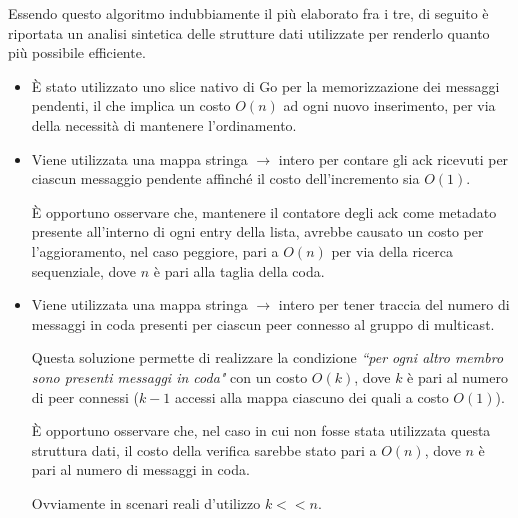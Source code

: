 \documentclass[conference]{IEEEtran}
\begin{document}
Essendo questo algoritmo indubbiamente il più elaborato fra i tre, di seguito è riportata un analisi sintetica delle strutture dati utilizzate per renderlo quanto più possibile efficiente.
\begin{itemize}
\item È stato utilizzato uno slice nativo di Go per la memorizzazione dei messaggi pendenti, il che implica un costo $O(n)$ ad ogni nuovo inserimento, per via della necessità di mantenere l'ordinamento.

\item Viene utilizzata una mappa stringa $\to$ intero per contare gli ack ricevuti per ciascun messaggio pendente affinché il costo dell'incremento sia $O(1)$.

È opportuno osservare che, mantenere il contatore degli ack come metadato presente all'interno di ogni entry della lista, avrebbe causato un costo per l'aggioramento, nel caso peggiore, pari a $O(n)$ per via della ricerca sequenziale, dove $n$ è pari alla taglia della coda.

\item Viene utilizzata una mappa stringa $\to$ intero per tener traccia del numero di messaggi in coda presenti per ciascun peer connesso al gruppo di multicast.

Questa soluzione permette di realizzare la condizione \textit{``per ogni altro membro sono presenti messaggi in coda"} con un costo $O(k)$, dove $k$ è pari al numero di peer connessi ($k-1$ accessi alla mappa ciascuno dei quali a costo $O(1)$).

È opportuno osservare che, nel caso in cui non fosse stata utilizzata questa struttura dati, il costo della verifica sarebbe stato pari a $O(n)$, dove $n$ è pari al numero di messaggi in coda.

Ovviamente in scenari reali d'utilizzo $k << n$.
\end{itemize}
\end{document}
